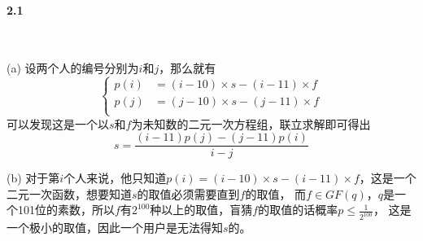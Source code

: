\paragraph{2.1}~{}

(a)
设两个人的编号分别为$i$和$j$，那么就有
$$
\left\{
\begin{aligned}
    p(i) &= (i-10)\times s-(i-11)\times f \\
    p(j) &= (j-10)\times s-(j-11)\times f \\
\end{aligned}
\right.
$$
可以发现这是一个以$s$和$f$为未知数的二元一次方程组，联立求解即可得出$$s=\frac{(i-11)p(j)-(j-11)p(i)}{i-j}$$

(b)
对于第$i$个人来说，他只知道$p(i) = (i-10)\times s-(i-11)\times f$，这是一个二元一次函数，想要知道$s$的取值必须需要直到$f$的取值，
而$f \in GF(q)$，$q$是一个101位的素数，所以$f$有$2^{100}$种以上的取值，盲猜$f$的取值的话概率$p \le \frac{1}{2^{100}}$，
这是一个极小的取值，因此一个用户是无法得知$s$的。